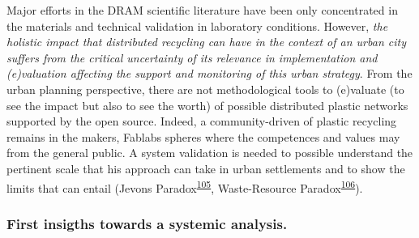 \documentclass[
  12pt,
  a4paperpaper,
  onecolumn]{article}
\begin{document}
Major efforts in the DRAM scientific literature have been only
concentrated in the materials and technical validation in laboratory
conditions. However, \emph{the holistic impact that distributed
recycling can have in the context of an urban city suffers from the
critical uncertainty of its relevance in implementation and (e)valuation
affecting the support and monitoring of this urban strategy}. From the
urban planning perspective, there are not methodological tools to
(e)valuate (to see the impact but also to see the worth) of possible
distributed plastic networks supported by the open source. Indeed, a
community-driven of plastic recycling remains in the makers, Fablabs
spheres where the competences and values may from the general public. A
system validation is needed to possible understand the pertinent scale
that his approach can take in urban settlements and to show the limits
that can entail (Jevons
Paradox\textsuperscript{\protect\hyperlink{ref-giampietro2018}{105}},
Waste-Resource
Paradox\textsuperscript{\protect\hyperlink{ref-Greer2021}{106}}).

\hypertarget{first-insigths-towards-a-systemic-analysis.}{%
\subsubsection{First insigths towards a systemic
analysis.}\label{first-insigths-towards-a-systemic-analysis.}}
\end{document}
